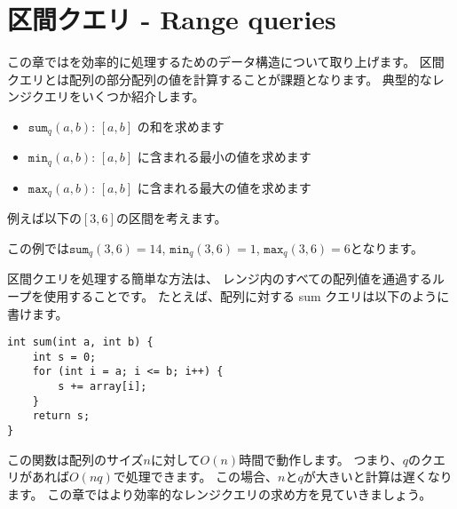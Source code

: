 \chapter{区間クエリ - Range queries}


この章ではを効率的に処理するためのデータ構造について取り上げます。
区間クエリとは配列の部分配列の値を計算することが課題となります。
典型的なレンジクエリをいくつか紹介します。

\begin{itemize}
\item $\texttt{sum}_q(a,b)$: $[a,b]$ の和を求めます
\item $\texttt{min}_q(a,b)$: $[a,b]$ に含まれる最小の値を求めます
\item $\texttt{max}_q(a,b)$: $[a,b]$ に含まれる最大の値を求めます
\end{itemize}

例えば以下の$[3,6]$の区間を考えます。
\begin{center}
\end{center}
この例では$\texttt{sum}_q(3,6)=14$,
$\texttt{min}_q(3,6)=1$, $\texttt{max}_q(3,6)=6$となります。

区間クエリを処理する簡単な方法は、
レンジ内のすべての配列値を通過するループを使用することです。
たとえば、配列に対する sum クエリは以下のように書けます。

\begin{lstlisting}
int sum(int a, int b) {
    int s = 0;
    for (int i = a; i <= b; i++) {
        s += array[i];
    }
    return s;
}
\end{lstlisting}

この関数は配列のサイズ$n$に対して$O(n)$時間で動作します。
つまり、$q$のクエリがあれば$O(nq)$で処理できます。
この場合、$n$と$q$が大きいと計算は遅くなります。
この章ではより効率的なレンジクエリの求め方を見ていきましょう。

